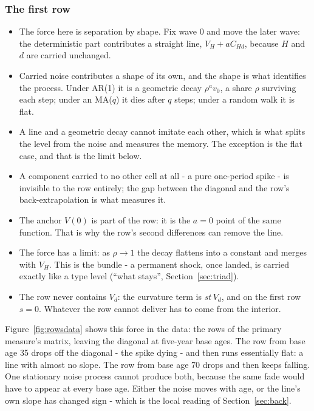 \documentclass[11pt]{article}
\theoremstyle{remark}
\begin{document}
\subsubsection*{The first row}

\begin{itemize}
\item The force here is separation by shape. Fix wave 0 and move the later wave: the deterministic part contributes a straight line, $V_H+aC_{Hd}$, because $H$ and $d$ are carried unchanged.
\item Carried noise contributes a shape of its own, and the shape is what identifies the process.
Under AR(1) it is a geometric decay $\rho^a v_0$, a share $\rho$ surviving each step; under an MA($q$) it dies after $q$ steps; under a random walk it is flat.
\item A line and a geometric decay cannot imitate each other, which is what splits the level from the noise and measures the memory. The exception is the flat case, and that is the limit below.
\item A component carried to no other cell at all - a pure one-period spike - is invisible to the row entirely; the gap between the diagonal and the row's back-extrapolation is what measures it.
\item The anchor $V(0)$ is part of the row: it is the $a=0$ point of the same function. That is why the row's second differences can remove the line.
\item The force has a limit: as $\rho\to1$ the decay flattens into a constant and merges with $V_H$.
This is the bundle - a permanent shock, once landed, is carried exactly like a type level (``what stays'', Section~\ref{sec:triad}).
\item The row never contains $V_d$: the curvature term is $st\,V_d$, and on the first row $s=0$. Whatever the row cannot deliver has to come from the interior.
\end{itemize}

Figure~\ref{fig:rowsdata} shows this force in the data: the rows of the primary measure's matrix, leaving the diagonal at five-year base ages.
The row from base age 35 drops off the diagonal - the spike dying - and then runs essentially flat: a line with almost no slope.
The row from base age 70 drops and then keeps falling.
One stationary noise process cannot produce both, because the same fade would have to appear at every base age.
Either the noise moves with age, or the line's own slope has changed sign - which is the local reading of Section~\ref{sec:back}.
\end{document}
